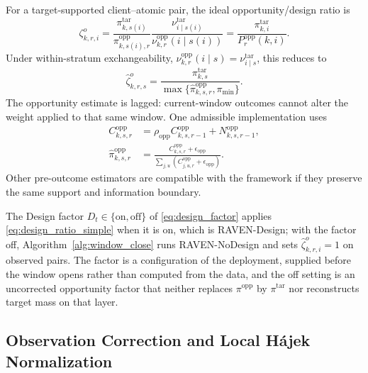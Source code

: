 \documentclass[letterpaper,journal]{IEEEtran}
\begin{document}
For a target-supported client--atomic pair, the ideal opportunity/design ratio is
\begin{equation}
 \zeta^{o}_{k,r,i}
 =
 \frac{\pi^{\mathrm{tar}}_{k,s(i)}}
      {\pi^{\mathrm{opp}}_{k,s(i),r}}
 \frac{\nu^{\mathrm{tar}}_{i\mid s(i)}}
      {\nu^{\mathrm{opp}}_{k,r}(i\mid s(i))}
 =
 \frac{\pi^{\mathrm{tar}}_{k,i}}
      {P_r^{\mathrm{opp}}(k,i)}.
 \label{eq:design_ratio_general}
\end{equation}
Under within-stratum exchangeability,
$\nu^{\mathrm{opp}}_{k,r}(i\mid s)=\nu^{\mathrm{tar}}_{i\mid s}$, this reduces to
\begin{equation}
 \widehat\zeta^{o}_{k,r,s}
 =
 \frac{\pi^{\mathrm{tar}}_{k,s}}
 {\max\{\widehat\pi^{\mathrm{opp}}_{k,s,r},\pi_{\min}\}}.
 \label{eq:design_ratio_simple}
\end{equation}
The opportunity estimate is lagged: current-window outcomes cannot alter the
weight applied to that same window.  One admissible implementation uses
\begin{align*}
 C^{\mathrm{opp}}_{k,s,r}
 &=
 \rho_{\mathrm{opp}}C^{\mathrm{opp}}_{k,s,r-1}
 +N^{\mathrm{opp}}_{k,s,r-1},\\
 \widehat\pi^{\mathrm{opp}}_{k,s,r}
 &=
 \frac{C^{\mathrm{opp}}_{k,s,r}+\epsilon_{\mathrm{opp}}}
 {\sum_{j,u}
 (C^{\mathrm{opp}}_{j,u,r}+\epsilon_{\mathrm{opp}})}.
\end{align*}
Other pre-outcome estimators are compatible with the framework if they preserve
the same support and information boundary.

The Design factor $D_t\in\{\mathrm{on},\mathrm{off}\}$ of
\eqref{eq:design_factor} applies \eqref{eq:design_ratio_simple} when it is on,
which is RAVEN-Design; with the factor off,
Algorithm~\ref{alg:window_close} runs RAVEN-NoDesign and sets
$\widehat\zeta^{o}_{k,r,i}=1$ on observed pairs.  The factor is a configuration of
the deployment, supplied before the window opens rather than computed from the
data, and the off setting is an uncorrected opportunity factor that neither
replaces $\pi^{\mathrm{opp}}$ by $\pi^{\mathrm{tar}}$ nor reconstructs target
mass on that layer.

\subsection{Observation Correction and Local H\'ajek Normalization}
\label{subsec:observation_hajek}
\end{document}
